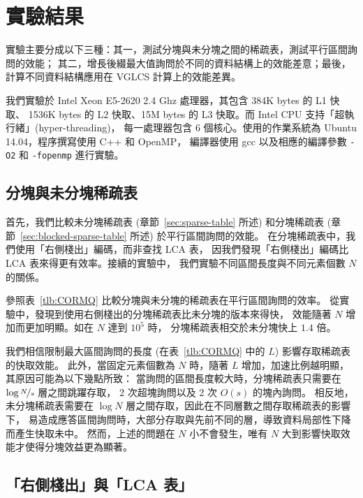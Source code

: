 \section{實驗結果} \label{sec:Experiment}

實驗主要分成以下三種：其一，測試分塊與未分塊之間的稀疏表，測試平行區間詢問的效能；
其二，增長後綴最大值詢問於不同的資料結構上的效能差意；最後，
計算不同資料結構應用在 VGLCS 計算上的效能差異。

我們實驗於 Intel Xeon E5-2620 2.4 Ghz 處理器，其包含 384K bytes 的 L1 快取、
1536K bytes 的 L2 快取、15M bytes 的 L3 快取。而 Intel CPU 支持「超執行緒」(hyper-threading)，
每一處理器包含 6 個核心。使用的作業系統為 Ubuntu 14.04，程序撰寫使用 C++ 和 OpenMP，
編譯器使用 gcc 以及相應的編譯參數 {\tt -O2} 和 {\tt -fopenmp} 進行實驗。

\subsection{分塊與未分塊稀疏表}

首先，我們比較未分塊稀疏表 (章節~\ref{sec:sparse-table} 所述) 
和分塊稀疏表 (章節~\ref{sec:blocked-sparse-table} 所述) 於平行區間詢問的效能。
在分塊稀疏表中，我們使用「右側棧出」編碼，而非查找 LCA 表，
因我們發現「右側棧出」編碼比 LCA 表來得更有效率。接續的實驗中，
我們實驗不同區間長度與不同元素個數 $N$ 的關係。

參照表~\ref{tlb:CORMQ} 比較分塊與未分塊的稀疏表在平行區間詢問的效率。
從實驗中，發現到使用右側棧出的分塊稀疏表比未分塊的版本來得快，
效能隨著 $N$ 增加而更加明顯。如在 $N$ 達到 $10^5$ 時，
分塊稀疏表相交於未分塊快上 $1.4$ 倍。

我們相信限制最大區間詢問的長度 (在表~\ref{tlb:CORMQ} 中的 $L$) 影響存取稀疏表的快取效能。
此外，當固定元素個數為 $N$ 時，隨著 $L$ 增加，加速比例越明顯，其原因可能為以下幾點所致：
當詢問的區間長度較大時，分塊稀疏表只需要在 $\log{\nicefrac{N}{s}}$ 層之間跳躍存取，
2 次超塊詢問以及 2 次 $O(s)$ 的塊內詢問。
相反地，未分塊稀疏表需要在 $\log{N}$ 層之間存取，因此在不同層數之間存取稀疏表的影響下，
易造成應答區間詢問時，大部分存取與先前不同的層，導致資料局部性下降而產生快取未中。
然而，上述的問題在 $N$ 小不會發生，唯有 $N$ 大到影響快取效能才使得分塊效益更為顯著。



\subsection{「右側棧出」與「LCA 表」}

